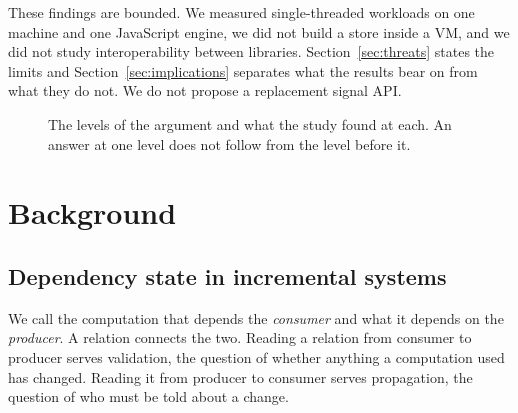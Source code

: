 \documentclass[11pt]{article}
\newcommand{\figlevel}[3]{\node[draw,text width=3.5cm,minimum height=1.3cm,align=center,font=\footnotesize\bfseries] at (0,-#1*1.75) {#2}; \node[text width=10.4cm,anchor=west,font=\footnotesize] at (2.3,-#1*1.75) {#3};}
\newcommand{\figarrow}[1]{\draw[->] (0,-#1*1.75-0.68) -- (0,-#1*1.75-1.07);}
\begin{document}
These findings are bounded. We measured single-threaded workloads on one machine and one JavaScript engine, we did not build a store inside a VM, and we did not study interoperability between libraries. Section~\ref{sec:threats} states the limits and Section~\ref{sec:implications} separates what the results bear on from what they do not. We do not propose a replacement signal API.

\begin{figure}[tbp]
\centering
{}
\caption{The levels of the argument and what the study found at each. An answer at one level does not follow from the level before it.}
\label{fig:levels}
\end{figure}

\section{Background}
\label{sec:background}

\subsection{Dependency state in incremental systems}

We call the computation that depends the \emph{consumer} and what it depends on the \emph{producer}. A relation connects the two. Reading a relation from consumer to producer serves validation, the question of whether anything a computation used has changed. Reading it from producer to consumer serves propagation, the question of who must be told about a change.
\end{document}
